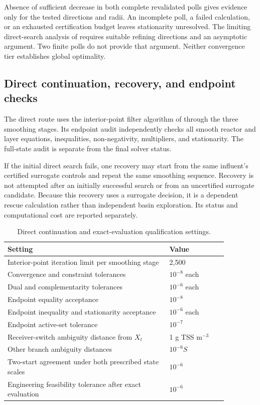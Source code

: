 Absence of sufficient decrease in both complete revalidated polls gives evidence only for the tested directions and radii. An incomplete poll, a failed calculation, or an exhausted certification budget leaves stationarity unresolved. The limiting direct-search analysis of \citet{AudetDennis2006} requires suitable refining directions and an asymptotic argument. Two finite polls do not provide that argument. Neither convergence tier establishes global optimality.

\subsection{Direct continuation, recovery, and endpoint checks}

The direct route uses the interior-point filter algorithm of \citet{WachterBiegler2006} through the three smoothing stages. Its endpoint audit independently checks all smooth reactor and layer equations, inequalities, non-negativity, multipliers, and stationarity. The full-state audit is separate from the final solver status.

If the initial direct search fails, one recovery may start from the same influent's certified surrogate controls and repeat the same smoothing sequence. Recovery is not attempted after an initially successful search or from an uncertified surrogate candidate. Because this recovery uses a surrogate decision, it is a dependent rescue calculation rather than independent basin exploration. Its status and computational cost are reported separately.

\begin{table}[htbp]
\centering\small
\caption{Direct continuation and exact-evaluation qualification settings.}\label{tab:plant_direct_settings}
\begin{tabular}{p{0.64\linewidth}p{0.23\linewidth}}
\toprule Setting & Value\\\midrule
Interior-point iteration limit per smoothing stage & 2{,}500\\
Convergence and constraint tolerances & $10^{-8}$ each\\
Dual and complementarity tolerances & $10^{-6}$ each\\
Endpoint equality acceptance & $10^{-8}$\\
Endpoint inequality and stationarity acceptance & $10^{-6}$ each\\
Endpoint active-set tolerance & $10^{-7}$\\
Receiver-switch ambiguity distance from $X_t$ & 1 g TSS m$^{-3}$\\
Other branch ambiguity distances & $10^{-6}S$\\
Two-start agreement under both prescribed state scales & $10^{-6}$\\
Engineering feasibility tolerance after exact evaluation & $10^{-6}$\\
\bottomrule
\end{tabular}
\end{table}

